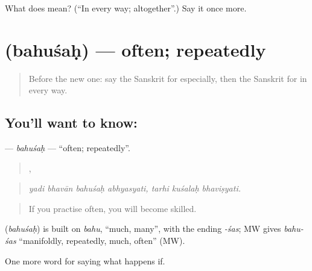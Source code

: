 \begin{tcolorbox}[breakable,colback=teal!4,colframe=teal!35!black,title={Before you move on}]
What does  mean? (\textquotedblleft{}In every way; altogether\textquotedblright{}.) Say it once more.
\end{tcolorbox}
\section[\texorpdfstring{\sk{बहुशः} (bahuśaḥ)}{बहुशः (bahuśaḥ)}]{ (bahuśaḥ) — often; repeatedly}

\label{lesson:SA-C381-bahusah}



\begin{quote}
Before the new one: say the Sanskrit for especially, then the Sanskrit for in every way.
\end{quote}

\subsection*{You'll want to know: }
\textbf{} — \emph{bahuśaḥ} — \textquotedblleft{}often; repeatedly\textquotedblright{}.

\begin{quote}
   ,   
\end{quote}

\begin{quote}
\emph{yadi bhavān bahuśaḥ abhyasyati, tarhi kuśalaḥ bhaviṣyati.}
\end{quote}

\begin{quote}
If you practise often, you will become skilled.
\end{quote}

\begin{cousinweb}
\textbf{} (\emph{bahuśaḥ}) is built on \emph{bahu}, \textquotedblleft{}much, many\textquotedblright{}, with the ending \emph{-śas}; MW gives \emph{bahu-śas} \textquotedblleft{}manifoldly, repeatedly, much, often\textquotedblright{} (MW).
\end{cousinweb}

\begin{grammarlens}[title={What you've built}]
One more word for saying what happens if.
\end{grammarlens}

